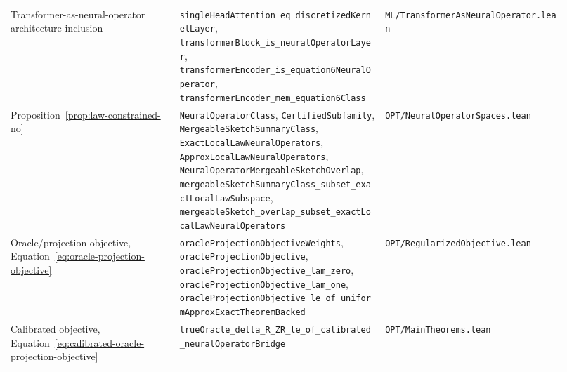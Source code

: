 {\begin{longtable}{p{0.28\linewidth}p{0.34\linewidth}p{0.30\linewidth}}
Transformer-as-neural-operator architecture inclusion &
\texttt{singleHeadAttention\_eq\_discretizedKernelLayer}, \texttt{transformerBlock\_is\_neuralOperatorLayer}, \texttt{transformerEncoder\_is\_equation6NeuralOperator}, \texttt{transformerEncoder\_mem\_equation6Class} &
\texttt{ML/TransformerAsNeuralOperator.lean} \\

Proposition~\ref{prop:law-constrained-no} &
\texttt{NeuralOperatorClass}, \texttt{CertifiedSubfamily}, \texttt{MergeableSketchSummaryClass}, \texttt{ExactLocalLawNeuralOperators}, \texttt{ApproxLocalLawNeuralOperators}, \texttt{NeuralOperatorMergeableSketchOverlap}, \texttt{mergeableSketchSummaryClass\_subset\_exactLocalLawSubspace}, \texttt{mergeableSketch\_overlap\_subset\_exactLocalLawNeuralOperators} &
\texttt{OPT/NeuralOperatorSpaces.lean} \\

Oracle/projection objective, Equation~\eqref{eq:oracle-projection-objective} &
\texttt{oracleProjectionObjectiveWeights}, \texttt{oracleProjectionObjective}, \texttt{oracleProjectionObjective\_lam\_zero}, \texttt{oracleProjectionObjective\_lam\_one}, \texttt{oracleProjectionObjective\_le\_of\_uniformApproxExactTheoremBacked} &
\texttt{OPT/RegularizedObjective.lean} \\

Calibrated objective, Equation~\eqref{eq:calibrated-oracle-projection-objective} &
\nolinkurl{trueOracle_delta_R_ZR_le_of_calibrated_neuralOperatorBridge} &
\texttt{OPT/MainTheorems.lean} \\


\end{longtable}}
